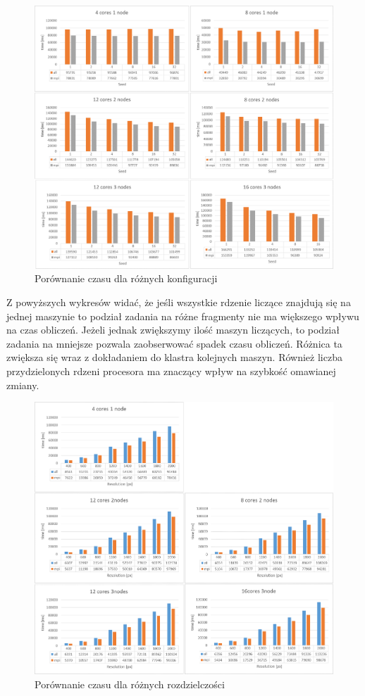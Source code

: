 \documentclass[a4paper]{article}
\begin{document}
\begin{figure}[H]
    \centering
    \includegraphics[width=\textwidth]{1.png}
    \caption{Porównanie czasu dla różnych konfiguracji}
    \label{fig:w1}
\end{figure}

Z powyższych wykresów widać, że jeśli wszystkie rdzenie liczące znajdują się na jednej maszynie to podział zadania na różne fragmenty nie ma większego wpływu na czas obliczeń. Jeżeli jednak zwiększymy ilość maszyn liczących, to podział zadania na mniejsze pozwala zaobserwować spadek czasu obliczeń. Różnica ta zwiększa się wraz z dokładaniem do klastra kolejnych maszyn. Również liczba przydzielonych rdzeni procesora ma znaczący wpływ na szybkość omawianej zmiany.

\begin{figure}[H]
    \centering
    \includegraphics[width=\textwidth]{2.png}
    \caption{Porównanie czasu dla różnych rozdzielczości}
    \label{fig:w2}
\end{figure}
\end{document}
